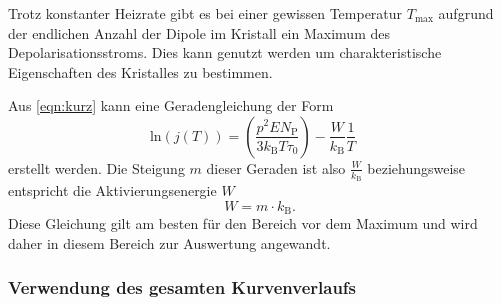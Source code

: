         Trotz konstanter Heizrate gibt es bei einer gewissen Temperatur $T_\text{max}$ aufgrund der endlichen Anzahl der Dipole im Kristall ein Maximum des Depolarisationsstroms.
        Dies kann genutzt werden um charakteristische Eigenschaften des Kristalles zu bestimmen.        
       	
        Aus \autoref{eqn:kurz} kann eine Geradengleichung der Form
        \begin{equation}
            \text{ln}(j(T)) = \left(\frac{p^2EN_\text{P}}{3k_\text{B}T\tau_0}\right) - \frac{W}{k_\text{B}} \frac{1}{T} \quad 
        \end{equation}
        erstellt werden.
        Die Steigung $m$ dieser Geraden ist also $\frac{W}{k_\text{B}}$ beziehungsweise entspricht die Aktivierungsenergie $W$
        \begin{equation}
            W = m \cdot k_\text{B}.
            \label{eqn:W}
        \end{equation}
        Diese Gleichung gilt am besten für den Bereich vor dem Maximum und wird daher in diesem Bereich zur Auswertung angewandt.			

\subsubsection{Verwendung des gesamten Kurvenverlaufs}

